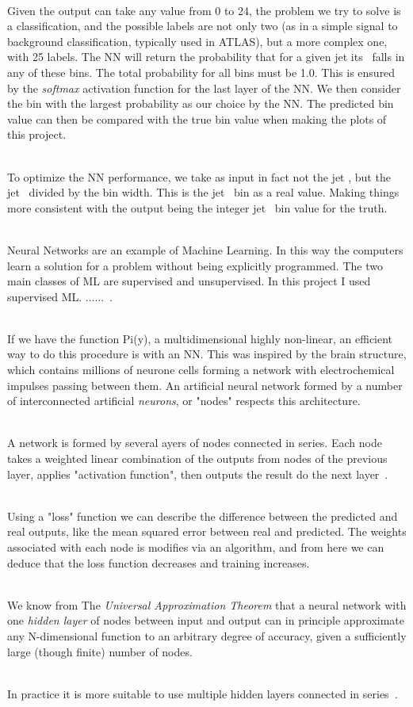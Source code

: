 \ \\Given the output can take any value from 0 to 24, the problem we try to solve is a classification, and the possible labels are not only two (as in a simple signal to background classification, typically used in ATLAS), but a more complex one, with 25 labels. The NN will return the probability that for a given jet its \pt~falls in any of these bins. The total probability for all bins must be 1.0. This is ensured by the \emph{softmax} activation function for the last layer of the NN. We then consider the bin with the largest probability as our choice by the NN. The predicted bin value can then be compared with the true bin value when making the plots of this project.

\ \\To optimize the NN performance, we take as input in fact not the jet \pt, but the jet \pt~divided by the bin width. This is the jet \pt~bin as a real value. Making things more consistent with the output being the integer jet \pt~bin value for the truth.

\ \\ Neural Networks are an example of Machine Learning. In this way the computers learn a solution for a problem without being explicitly programmed. The two main classes of ML are supervised and unsupervised. 
In this project I used supervised ML. ......~\cite{AndrewNg}.

\ \\If we have the function Pi(y), a multidimensional highly non-linear, an efficient way to do this procedure is with an NN. This was inspired by the brain structure, which contains millions of neurone cells forming a network with electrochemical impulses passing between them. An artificial neural network formed by a number of interconnected artificial \emph{neurons}, or "nodes" respects this architecture. 

\ \\A network is formed by several ayers of nodes connected in series. Each node takes a weighted linear combination of the outputs from nodes of the previous layer, applies "activation function", then outputs the result do the next layer~\cite{AndrewNg}.

\ \\Using a "loss" function we can describe the difference between the predicted and real outputs, like the mean squared error between real and predicted. The weights associated with each node is modifies via an algorithm, and from here we can deduce that the loss function decreases and training increases.

\ \\We know from The \emph{Universal Approximation Theorem} that a neural network with one \emph{hidden layer} of nodes between input and output can in principle approximate any N-dimensional function to an arbitrary degree of accuracy, given a sufficiently large (though finite) number of nodes. 

\ \\In practice it is more suitable to use multiple hidden layers connected in series~\cite{AndrewNg}.
